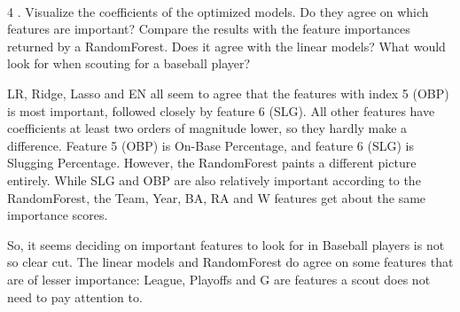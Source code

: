 \documentclass[11pt]{article}
\begin{document}
    \begin{center}
    \end{center}
    { \hspace*{\fill} \\}
    
    4 . Visualize the coefficients of the optimized models. Do they agree on
which features are important? Compare the results with the feature
importances returned by a RandomForest. Does it agree with the linear
models? What would look for when scouting for a baseball player?

LR, Ridge, Lasso and EN all seem to agree that the features with index 5
(OBP) is most important, followed closely by feature 6 (SLG). All other
features have coefficients at least two orders of magnitude lower, so
they hardly make a difference. Feature 5 (OBP) is On-Base Percentage,
and feature 6 (SLG) is Slugging Percentage. However, the RandomForest
paints a different picture entirely. While SLG and OBP are also
relatively important according to the RandomForest, the Team, Year, BA,
RA and W features get about the same importance scores.

So, it seems deciding on important features to look for in Baseball
players is not so clear cut. The linear models and RandomForest do agree
on some features that are of lesser importance: League, Playoffs and G
are features a scout does not need to pay attention to.
\end{document}
